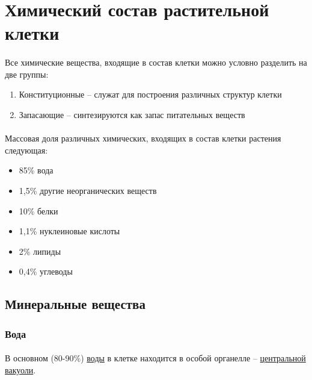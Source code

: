 \section*{Химический состав растительной клетки}

\paragraph*{}Все химические вещества, входящие в состав клетки можно условно разделить на две группы:

\begin{enumerate}
	\item Конституционные -- служат для построения различных структур клетки
	\item Запасающие -- синтезируются как запас питательных веществ
\end{enumerate}

\paragraph*{}Массовая доля различных химических, входящих в состав клетки растения следующая:

\begin{itemize}

	\item 85\% вода
	\item 1,5\% другие неорганических веществ
	\item 10\% белки
	\item 1,1\% нуклеиновые кислоты
	\item 2\% липиды
	\item 0,4\% углеводы

\end{itemize}

\subsection*{Минеральные вещества} 

\subsubsection*{Вода}

\paragraph*{}В основном (80-90\%) \hyperlink{question_aqua}{воды} в клетке находится в особой органелле -- \hyperlink{question_vakual_rep}{центральной вакуоли}. 

